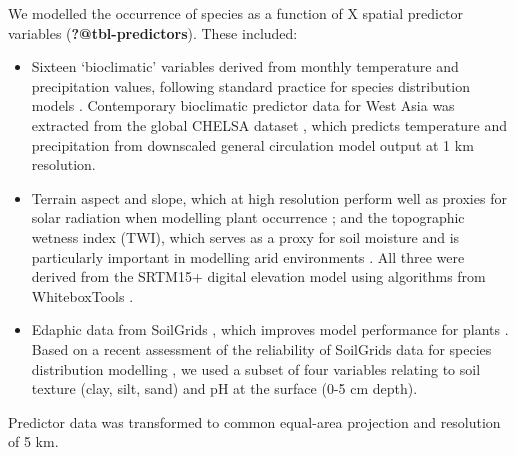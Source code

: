 \documentclass[
  authoryear,
  review]{elsarticle}
\providecommand{\tightlist}{%
  \setlength{\itemsep}{0pt}\setlength{\parskip}{0pt}}\usepackage{longtable,booktabs,array}
\begin{document}
We modelled the occurrence of species as a function of X spatial
predictor variables (\textbf{?@tbl-predictors}). These included:

\begin{itemize}
\tightlist
\item
  Sixteen `bioclimatic' variables derived from monthly temperature and
  precipitation values, following standard practice for species
  distribution models \citep{HijmansEtAl2005}. Contemporary bioclimatic
  predictor data for West Asia was extracted from the global CHELSA
  dataset \citep{KargerEtAl2017}, which predicts temperature and
  precipitation from downscaled general circulation model output at 1 km
  resolution.
\end{itemize}

\begin{itemize}
\tightlist
\item
  Terrain aspect and slope, which at high resolution perform well as
  proxies for solar radiation when modelling plant occurrence
  \citep{AustinVanNiel2011, LeempoelEtAl2015}; and the topographic
  wetness index (TWI), which serves as a proxy for soil moisture and is
  particularly important in modelling arid environments
  \citep{KopeckyCizkova2010, CamposEtAl2016, DiVirgilioEtAl2018}. All
  three were derived from the SRTM15+ digital elevation model using
  algorithms from WhiteboxTools \citep{Lindsay2016}.
\end{itemize}

\begin{itemize}
\tightlist
\item
  Edaphic data from SoilGrids \citep{HenglEtAl2014, HenglEtAl2017},
  which improves model performance for plants
  \citep{DubuisEtAl2013, ModEtAl2016, VelazcoEtAl2017}. Based on a
  recent assessment of the reliability of SoilGrids data for species
  distribution modelling \citep{MillerEtAl2024}, we used a subset of
  four variables relating to soil texture (clay, silt, sand) and pH at
  the surface (0-5 cm depth).
\end{itemize}

Predictor data was transformed to common equal-area projection and
resolution of 5 km.

\begin{table}

\caption{\label{tbl-climate-periods}}


\end{table}%
\end{document}
